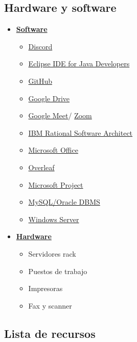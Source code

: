 \subsection{Hardware y software}
\begin{itemize}
	\item \textbf{\underline{Software}}
	      \begin{itemize}
		      \item \href{https://discord.com}{Discord}
		      \item \href{https://www.eclipse.org/}{Eclipse IDE for Java Developers}
		      \item \href{https://github.com}{GitHub}
		      \item \href{https://drive.google.com}{Google Drive}
		      \item \href{https://meet.google.com}{Google Meet}/ \href{https://zoom.us}{Zoom}
		      \item \href{https://www.ibm.com/products/rational-software-architect-designer}{IBM Rational Software Architect}
		      \item \href{https://www.microsoft.com/es-es/microsoft-365}{Microsoft Office}
		      \item \href{https://overleaf.com}{Overleaf}
		      \item \href{https://www.microsoft.com/es-es/microsoft-365/project/project-management-software}{Microsoft Project}
		      \item \href{https://www.oracle.com/es/enterprise-manager/technologies/}{MySQL/Oracle DBMS}
		      \item \href{https://www.microsoft.com/es-es/windows-server}{Windows Server}
	      \end{itemize}
	\item \textbf{\underline{Hardware}}
	      \begin{itemize}
		      \item Servidores rack
		      \item Puestos de trabajo
		      \item Impresoras
		      \item Fax y scanner
	      \end{itemize}
\end{itemize}

\subsection{Lista de recursos}

